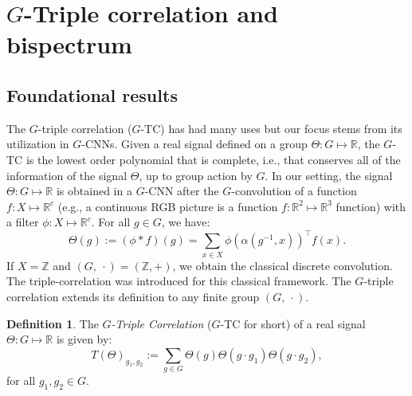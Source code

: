 \documentclass{article}
\theoremstyle{plain}
\theoremstyle{definition}
\newtheorem{definition}[theorem]{Definition}
\theoremstyle{remark}
\begin{document}
\section{$G$-Triple correlation and bispectrum}\label{sec:triple_corr_and_bsp}
\subsection{Foundational results}
The $G$-triple correlation ($G$-TC) \cite{kakarala_thesis} has had many uses but our focus stems from its utilization in $G$-CNNs. Given a real signal defined on a group $\Theta:G\mapsto\mathbb{R}$, the $G$-TC is the lowest order polynomial that is complete, i.e., that conserves all of the information of the signal $\Theta$, up to group action by $G$. In our setting, the signal $\Theta:G\mapsto\mathbb{R}$ is obtained in a $G$-CNN after the $G$-convolution of a function $f:X\mapsto\mathbb{R}^c$ (e.g., a continuous RGB picture is a function $f:\mathbb{R}^2\mapsto\mathbb{R}^3$ function) with a filter $\phi:X\mapsto\mathbb{R}^c$. For all $g \in G$, we have:
\begin{equation}
    \Theta(g):=(\phi*f)(g) = \sum_{x\in X}\phi(\alpha(g^{-1},x))^{\top}f(x).
\end{equation}
 If $X =\mathbb{Z}$ and $(G,\ \cdot) = (\mathbb{Z},+)$, we obtain the classical discrete convolution. The triple-correlation was introduced for this classical framework. The $G$-triple correlation \cite{kakarala_thesis} extends its definition to any finite group $(G,\ \cdot)$.
\begin{definition}
    The \emph{$G$-Triple Correlation} ($G$-TC for short) of a real signal $\Theta:G\mapsto\mathbb{R}$ is given by:
    \begin{equation}
        T(\Theta)_{g_1,g_2}:=\sum_{g\in G} \Theta(g)\Theta(g\cdot g_1)\Theta(g\cdot g_2),
    \end{equation}
    for all $g_1, g_2\in G$.
\end{definition}
\end{document}
